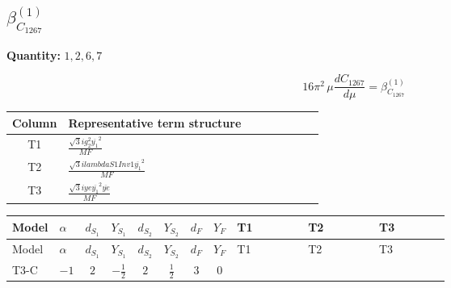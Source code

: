 \documentclass[8pt]{article}
\begin{document}
\begin{landscape}
\section*{$\beta_{C_{1267}}^{(1)}$}
\noindent\textbf{Quantity: }$\mathrm{1,2,6,7}$\par\smallskip
\[16\pi^2\,\mu\frac{d C_{1267}}{d\mu}=\beta_{C_{1267}}^{(1)}\]
\begin{center}
\begin{tabular}{@{}c >{\raggedright\arraybackslash}p{0.82\linewidth}@{}}
\toprule
Column & Representative term structure \\
\midrule
T1 & \(\displaystyle \frac{\sqrt{3} i g_{2}^{2} \overline{y_{1}}^{2}}{MF}\) \\
\midrule
T2 & \(\displaystyle \frac{\sqrt{3} i lambdaS1Inv1 \overline{y_{1}}^{2}}{MF}\) \\
\midrule
T3 & \(\displaystyle \frac{\sqrt{3} i ye \overline{y_{1}}^{2} \overline{ye}}{MF}\) \\
\midrule
\bottomrule
\end{tabular}
\end{center}
\smallskip
\tiny
\begin{longtable}{@{}llcccccc >{\raggedright\arraybackslash}p{0.21\linewidth} >{\raggedright\arraybackslash}p{0.21\linewidth} >{\raggedright\arraybackslash}p{0.21\linewidth}@{}}
\toprule
Model & $\alpha$ & $d_{S_1}$ & $Y_{S_1}$ & $d_{S_2}$ & $Y_{S_2}$ & $d_F$ & $Y_F$ & T1 & T2 & T3 \\
\midrule
\endfirsthead
\toprule
Model & $\alpha$ & $d_{S_1}$ & $Y_{S_1}$ & $d_{S_2}$ & $Y_{S_2}$ & $d_F$ & $Y_F$ & T1 & T2 & T3 \\
\midrule
\endhead
T3-C & $-1$ & $2$ & $-\frac{1}{2}$ & $2$ & $\frac{1}{2}$ & $3$ & $0$ & \scriptsize\adjustbox{max width=\linewidth}{$\begin{gathered} \frac{\sqrt{3} i g_{2}^{2} \overline{y_{1}}^{2}}{8 MF}\end{gathered}$} & \scriptsize\adjustbox{max width=\linewidth}{$\begin{gathered} \frac{\sqrt{3} i lambdaS1Inv1 \overline{y_{1}}^{2}}{12 MF}\end{gathered}$} & \scriptsize\adjustbox{max width=\linewidth}{$\begin{gathered} - \frac{\sqrt{3} i ye \overline{y_{1}}^{2} \overline{ye}}{24 MF}\end{gathered}$} \\
\midrule
\bottomrule
\end{longtable}
\clearpage

\end{landscape}
\end{document}
